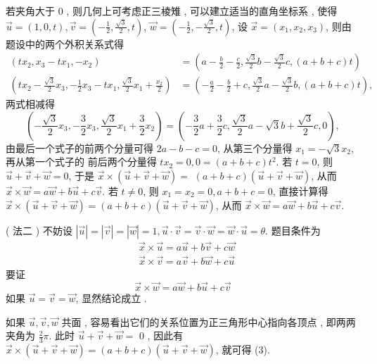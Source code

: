 \documentclass[10pt]{article}
\begin{document}
 若夹角大于  0 ,  则几何上可考虑正三棱雉 ,  可以建立适当的直角坐标系 ,  使得  $\vec{u}=(1,0, t), \vec{v}=\left(-\frac{1}{2}, \frac{\sqrt{3}}{2}, t\right)$, $\vec{w}=\left(-\frac{1}{2},-\frac{\sqrt{3}}{2}, t\right)$,  设  $\vec{x}=\left(x_{1}, x_{2}, x_{3}\right)$,  则由题设中的两个外积关系式得 
$$
\begin{aligned}
\left(t x_{2}, x_{3}-t x_{1},-x_{2}\right) &=\left(a-\frac{b}{2}-\frac{c}{2}, \frac{\sqrt{3}}{2} b-\frac{\sqrt{3}}{2} c,(a+b+c) t\right) \\
\left(t x_{2}-\frac{\sqrt{3}}{2} x_{3},-\frac{1}{2} x_{3}-t x_{1}, \frac{\sqrt{3}}{2} x_{1}+\frac{x_{2}}{2}\right) &=\left(-\frac{a}{2}-\frac{b}{2}+c, \frac{\sqrt{3}}{2} a-\frac{\sqrt{3}}{2} b,(a+b+c) t\right),
\end{aligned}
$$
 两式相减得 
$$
\left(-\frac{\sqrt{3}}{2} x_{3},-\frac{3}{2} x_{3}, \frac{\sqrt{3}}{2} x_{1}+\frac{3}{2} x_{2}\right)=\left(-\frac{3}{2} a+\frac{3}{2} c, \frac{\sqrt{3}}{2} a-\sqrt{3} b+\frac{\sqrt{3}}{2} c, 0\right),
$$
 由最后一个式子的前两个分量可得  $2 a-b-c=0$,  从第三个分量得  $x_{1}=-\sqrt{3} x_{2}$,  再从第一个式子的   前后两个分量得  $t x_{2}=0,0=(a+b+c) t^{2}$.  若  $t=0$,  则  $\vec{u}+\vec{v}+\vec{w}=0$,  于是  $\vec{x} \times(\vec{u}+\vec{v}+\vec{w})=$ $(a+b+c)(\vec{u}+\vec{v}+\vec{w})$,  从而  $\vec{x} \times \vec{w}=a \vec{w}+b \vec{u}+c \vec{v}$.  若  $t \neq 0$,  则  $x_{1}=x_{2}=0, a+b+c=0$,  直接计算得  $\vec{x} \times(\vec{u}+\vec{v}+\vec{w})=(a+b+c)(\vec{u}+\vec{v}+\vec{w})$,  从而  $\vec{x} \times \vec{w}=a \vec{w}+b \vec{u}+c \vec{v} .$

( 法二 )  不妨设  $|\vec{u}|=|\vec{v}|=|\vec{w}|=1, \vec{u} \cdot \vec{v}=\vec{v} \cdot \vec{w}=\vec{w} \cdot \vec{u}=\theta$.  题目条件为 
$$
\begin{aligned}
&\vec{x} \times \vec{u}=a \vec{u}+b \vec{v}+c \vec{w} \\
&\vec{x} \times \vec{v}=a \vec{v}+b \vec{w}+c \vec{u}
\end{aligned}
$$
 要证 
$$
\vec{x} \times \vec{w}=a \vec{w}+b \vec{u}+c \vec{v}
$$
 如果  $\vec{u}=\vec{v}=\vec{w}$,  显然结论成立 .

 如果  $\vec{u}, \vec{v}, \vec{w}$  共面 ,  容易看出它们的关系位置为正三角形中心指向各顶点 ,  即两两夹角为  $\frac{2}{3} \pi$.  此时  $\vec{u}+\vec{v}+\vec{w}=$ 0 ,  因此有  $\vec{x} \times(\vec{u}+\vec{v}+\vec{w})=(a+b+c)(\vec{u}+\vec{v}+\vec{w})$,  就可得  (3).
\end{document}

